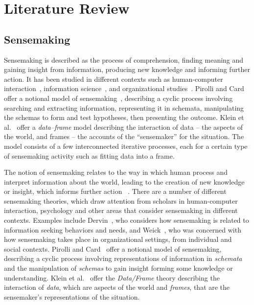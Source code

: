 \chapter{Literature Review}

\graphicspath{{Chapter2/figures/}}

 \section{Sensemaking}
 Sensemaking is described as the process of comprehension, finding meaning and gaining insight from information, producing new knowledge and informing further action. It has been studied in different contexts such as human-computer interaction~\cite{Russell1993}, information science~\cite{Dervin1983}, and organizational studies~\cite{Weick1995}. Pirolli and Card offer a notional model of sensemaking~\cite{Pirolli2005}, describing a cyclic process involving searching and extracting information, representing it in schemata, manipulating the schemas to form and test hypotheses, then presenting the outcome. Klein et al.~\cite{Klein2006} offer a \textit{data--frame} model describing the interaction of data -- the aspects of the world, and frames -- the accounts of the ``sensemaker'' for the situation. The model consists of a few interconnected iterative processes, each for a certain type of sensemaking activity such as fitting data into a frame.

The notion of sensemaking relates to the way in which human process and interpret information about the world, leading to the creation of new knowledge or insight, which informs further action ~\cite{Pirolli2005}. There are a number of different sensemaking theories, which draw attention from scholars in human-computer interaction, psychology and other areas that consider sensemaking in different contexts. Examples include Dervin~\cite{Dervin1983}, who considers how sensemaking is related to information seeking behaviors and needs, and Weick~\cite{Weick1995}, who was concerned with how sensemaking takes place in organizational settings, from individual and social contexts. Pirolli and Card~\cite{Pirolli2005} offer a notional model of sensemaking, describing a cyclic process involving representations of information in \textit{schemata} and the manipulation of \textit{schemas} to gain insight forming some knowledge or understanding. Klein et al.~\cite{Klein2006} offer the \textit{Data/Frame} theory describing the interaction of \textit{data}, which are aspects of the world and \textit{frames}, that are the sensemaker’s representations of the situation. 


